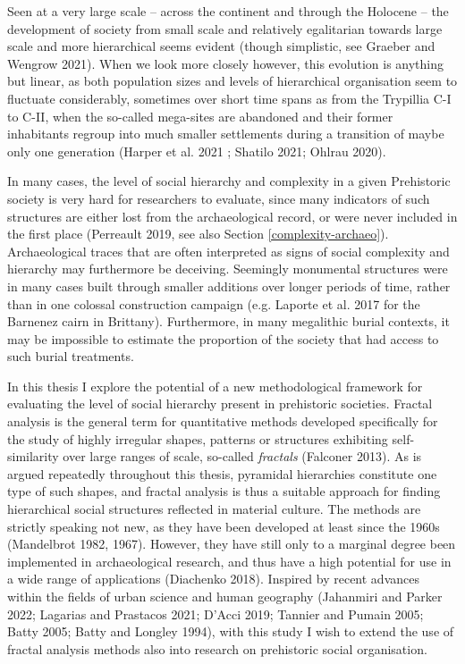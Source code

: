 \documentclass[
  12pt,
  a4paper, twoside]{book}
\begin{document}
Seen at a very large scale -- across the continent and through the Holocene -- the development of society from small scale and relatively egalitarian towards large scale and more hierarchical seems evident (though simplistic, see Graeber and Wengrow 2021). When we look more closely however, this evolution is anything but linear, as both population sizes and levels of hierarchical organisation seem to fluctuate considerably, sometimes over short time spans as from the Trypillia C-I to C-II, when the so-called mega-sites are abandoned and their former inhabitants regroup into much smaller settlements during a transition of maybe only one generation (Harper et al. 2021 ; Shatilo 2021; Ohlrau 2020).

In many cases, the level of social hierarchy and complexity in a given Prehistoric society is very hard for researchers to evaluate, since many indicators of such structures are either lost from the archaeological record, or were never included in the first place (Perreault 2019, see also Section \ref{complexity-archaeo}). Archaeological traces that are often interpreted as signs of social complexity and hierarchy may furthermore be deceiving. Seemingly monumental structures were in many cases built through smaller additions over longer periods of time, rather than in one colossal construction campaign (e.g. Laporte et al. 2017 for the Barnenez cairn in Brittany). Furthermore, in many megalithic burial contexts, it may be impossible to estimate the proportion of the society that had access to such burial treatments.

In this thesis I explore the potential of a new methodological framework for evaluating the level of social hierarchy present in prehistoric societies. Fractal analysis is the general term for quantitative methods developed specifically for the study of highly irregular shapes, patterns or structures exhibiting self-similarity over large ranges of scale, so-called \emph{fractals} (Falconer 2013). As is argued repeatedly throughout this thesis, pyramidal hierarchies constitute one type of such shapes, and fractal analysis is thus a suitable approach for finding hierarchical social structures reflected in material culture. The methods are strictly speaking not new, as they have been developed at least since the 1960s (Mandelbrot 1982, 1967). However, they have still only to a marginal degree been implemented in archaeological research, and thus have a high potential for use in a wide range of applications (Diachenko 2018). Inspired by recent advances within the fields of urban science and human geography (Jahanmiri and Parker 2022; Lagarias and Prastacos 2021; D'Acci 2019; Tannier and Pumain 2005; Batty 2005; Batty and Longley 1994), with this study I wish to extend the use of fractal analysis methods also into research on prehistoric social organisation.
\end{document}
